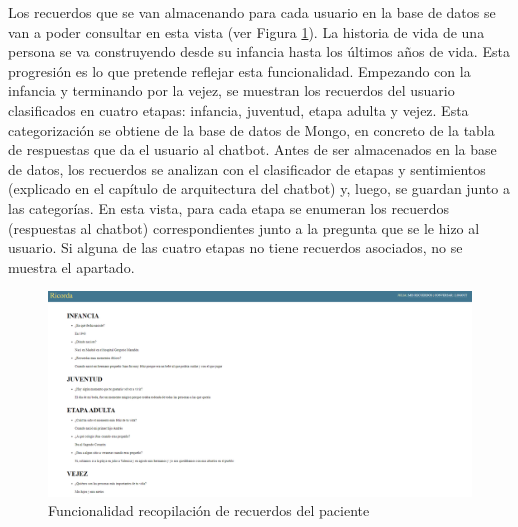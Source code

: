 Los recuerdos que se van almacenando para cada usuario en la base de datos se van a poder consultar en esta vista (ver Figura \ref{fig:funcionalidadhistoriavida}). La historia de vida de una persona se va construyendo desde su infancia hasta los últimos años de vida. Esta progresión es lo que pretende reflejar esta funcionalidad. Empezando con la infancia y terminando por la vejez, se muestran los recuerdos del usuario clasificados en cuatro etapas: infancia, juventud, etapa adulta y vejez. Esta categorización se obtiene de la base de datos de Mongo, en concreto de la tabla de respuestas que da el usuario al chatbot. Antes de ser almacenados en la base de datos, los recuerdos se analizan con el clasificador de etapas y sentimientos (explicado en el capítulo de arquitectura del chatbot) y, luego, se guardan junto a las categorías. En esta vista, para cada etapa se enumeran los recuerdos (respuestas al chatbot) correspondientes junto a la pregunta que se le hizo al usuario. Si alguna de las cuatro etapas no tiene recuerdos asociados, no se muestra el apartado. 

\begin{figure}[h]
	\centering
	\includegraphics[scale=0.6]{Imagenes/Vectorial/funcionalidad_historia_vida}
	\caption{Funcionalidad recopilación de recuerdos del paciente}
	\label{fig:funcionalidadhistoriavida}
\end{figure}




